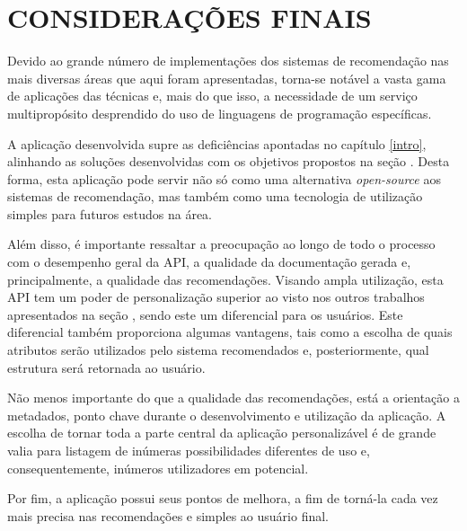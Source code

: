 \chapter{CONSIDERAÇÕES FINAIS}

Devido ao grande número de implementações dos sistemas de recomendação nas mais diversas áreas que aqui foram apresentadas, torna-se notável a vasta gama de aplicações das técnicas e, mais do que isso, a necessidade de um serviço multipropósito desprendido do uso de linguagens de programação específicas.

A aplicação desenvolvida supre as deficiências apontadas no capítulo \ref{intro}, alinhando as soluções desenvolvidas com os objetivos propostos na seção . Desta forma, esta aplicação pode servir não só como uma alternativa \textit{open-source} aos sistemas de recomendação, mas também como uma tecnologia de utilização simples para futuros estudos na área.

Além disso, é importante ressaltar a preocupação ao longo de todo o processo com o desempenho geral da API, a qualidade da documentação gerada e, principalmente, a qualidade das recomendações. Visando ampla utilização, esta API tem um poder de personalização superior ao visto nos outros trabalhos apresentados na seção , sendo este um diferencial para os usuários. Este diferencial também proporciona algumas vantagens, tais como a escolha de quais atributos serão utilizados pelo sistema recomendados e, posteriormente, qual estrutura será retornada ao usuário.

Não menos importante do que a qualidade das recomendações, está a orientação a metadados, ponto chave durante o desenvolvimento e utilização da aplicação. A escolha de tornar toda a parte central da aplicação personalizável é de grande valia para listagem de inúmeras possibilidades diferentes de uso e, consequentemente, inúmeros utilizadores em potencial.

Por fim, a aplicação possui seus pontos de melhora, a fim de torná-la cada vez mais precisa nas recomendações e simples ao usuário final.
